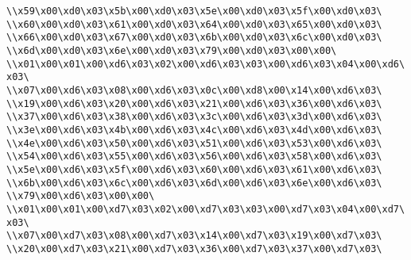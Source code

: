 \verb|\\x59\x00\xd0\x03\x5b\x00\xd0\x03\x5e\x00\xd0\x03\x5f\x00\xd0\x03\|\newline
\verb|\\x60\x00\xd0\x03\x61\x00\xd0\x03\x64\x00\xd0\x03\x65\x00\xd0\x03\|\newline
\verb|\\x66\x00\xd0\x03\x67\x00\xd0\x03\x6b\x00\xd0\x03\x6c\x00\xd0\x03\|\newline
\verb|\\x6d\x00\xd0\x03\x6e\x00\xd0\x03\x79\x00\xd0\x03\x00\x00\|\newline
\verb|\\x01\x00\x01\x00\xd6\x03\x02\x00\xd6\x03\x03\x00\xd6\x03\x04\x00\xd6\x03\|\newline
\verb|\\x07\x00\xd6\x03\x08\x00\xd6\x03\x0c\x00\xd8\x00\x14\x00\xd6\x03\|\newline
\verb|\\x19\x00\xd6\x03\x20\x00\xd6\x03\x21\x00\xd6\x03\x36\x00\xd6\x03\|\newline
\verb|\\x37\x00\xd6\x03\x38\x00\xd6\x03\x3c\x00\xd6\x03\x3d\x00\xd6\x03\|\newline
\verb|\\x3e\x00\xd6\x03\x4b\x00\xd6\x03\x4c\x00\xd6\x03\x4d\x00\xd6\x03\|\newline
\verb|\\x4e\x00\xd6\x03\x50\x00\xd6\x03\x51\x00\xd6\x03\x53\x00\xd6\x03\|\newline
\verb|\\x54\x00\xd6\x03\x55\x00\xd6\x03\x56\x00\xd6\x03\x58\x00\xd6\x03\|\newline
\verb|\\x5e\x00\xd6\x03\x5f\x00\xd6\x03\x60\x00\xd6\x03\x61\x00\xd6\x03\|\newline
\verb|\\x6b\x00\xd6\x03\x6c\x00\xd6\x03\x6d\x00\xd6\x03\x6e\x00\xd6\x03\|\newline
\verb|\\x79\x00\xd6\x03\x00\x00\|\newline
\verb|\\x01\x00\x01\x00\xd7\x03\x02\x00\xd7\x03\x03\x00\xd7\x03\x04\x00\xd7\x03\|\newline
\verb|\\x07\x00\xd7\x03\x08\x00\xd7\x03\x14\x00\xd7\x03\x19\x00\xd7\x03\|\newline
\verb|\\x20\x00\xd7\x03\x21\x00\xd7\x03\x36\x00\xd7\x03\x37\x00\xd7\x03\|\newline
